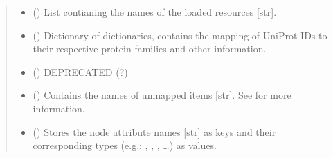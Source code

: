 \documentclass[letterpaper,10pt,english]{sphinxmanual}
\begin{document}
\begin{fulllineitems}
\begin{quote}
\begin{description}
\begin{itemize}
\item {} 
 () \textendash{} List contianing the names of the loaded resources {[}str{]}.

\item {} 
 () \textendash{} Dictionary of dictionaries, contains the mapping of UniProt IDs
to their respective protein families and other information.

\item {} 
 () \textendash{} DEPRECATED (?)

\item {} 
 () \textendash{} Contains the names of unmapped items {[}str{]}. See
{\hyperref[\detokenize{reference:pypath.main.PyPath.map_item}]{}} for more information.

\item {} 
 () \textendash{} Stores the node attribute names {[}str{]} as keys and their
corresponding types (e.g.: , , , …) as
values.

\end{itemize}

\end{description}\end{quote}

\begin{fulllineitems}
\label{\detokenize{reference:pypath.main.PyPath.acsn_effects}}
\end{fulllineitems}


\begin{fulllineitems}
\label{\detokenize{reference:pypath.main.PyPath.add_genesets}}
\end{fulllineitems}


\end{fulllineitems}
\end{document}
